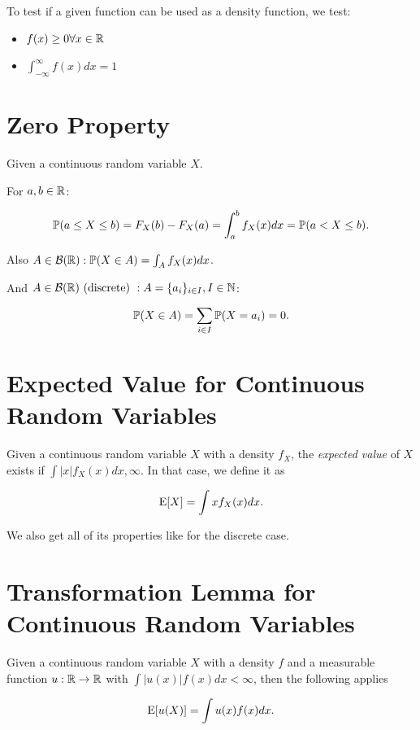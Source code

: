 To test if a given function can be used as a density function, we test:

\begin{itemize}
	
    \item \(f(x) \ge 0 \forall x \in \mathbb{R} \)

    \item \(\int_{-\infty}^{\infty} f(x) dx = 1\)

\end{itemize}

\section{Zero Property}

Given a continuous random variable \(X\).

For \(a, b \in \mathbb{R}\):

\[
    \mathbb{P}(a \le X \le b ) = F_X (b) - F_X (a) = \int_{a}^{b} f_X(x)dx = \mathbb{P}(a < X \le b).
\]

Also \(A \in \mathcal{B}(\mathbb{R}): \mathbb{P}(X \in A) = \int_A f_X (x)dx\).

And \(A \in \mathcal{B}(\mathbb{R}) \text{ (discrete) }: A = \{a_i\}_{i \in I}, I \in \mathbb{N}\): 

\[
    \mathbb{P}(X \in A) = \sum_{i \in I} \mathbb{P}(X = a_i) = 0.
\]

\section{Expected Value for Continuous Random Variables}

Given a continuous random variable \(X\) with a density \(f_X\), the \emph{expected value} of \(X\) exists if \(\int |x|f_X(x)dx , \infty\). 
In that case, we define it as 

\[
    \mathrm{E}[X] = \int x f_X (x)dx.
\]

We also get all of its properties like for the discrete case.

\section{Transformation Lemma for Continuous Random Variables}

Given a continuous random variable \(X\) with a density \(f\) and a measurable function \(u: \mathbb{R} \to \mathbb{R}\) 
with \(\int |u(x)|f(x)dx < \infty\), then the following applies 

\[
    \mathrm{E}[u(X)] = \int u(x) f(x) dx.
\]

